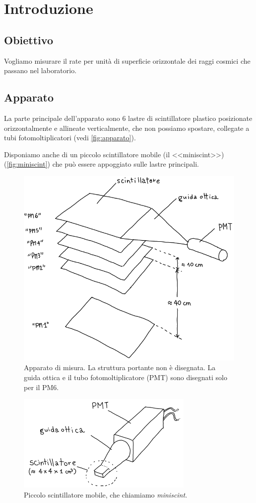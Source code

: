 \section{Introduzione}

\subsection{Obiettivo}

Vogliamo misurare il rate per unità di superficie orizzontale
dei raggi cosmici che passano nel laboratorio.

\subsection{Apparato}

La parte principale dell'apparato sono 6 lastre di scintillatore plastico
posizionate orizzontalmente e allineate verticalmente,
che non possiamo spostare,
collegate a tubi fotomoltiplicatori (vedi \autoref{fig:apparato}).

Disponiamo anche di un piccolo scintillatore mobile (il <<miniscint>>) (\autoref{fig:miniscint})
che può essere appoggiato sulle lastre principali.

\begin{figure}[H]
	\center
	\includegraphics[width=\textwidth]{apparato}
	\caption{\label{fig:apparato}
	Apparato di misura.
	La struttura portante non è disegnata.
	La guida ottica e il tubo fotomoltiplicatore (PMT) sono disegnati solo per il PM6.}
\end{figure}

\begin{figure}[H]
	\center
	\includegraphics[width=23em]{miniscint}
	\caption{\label{fig:miniscint}
	Piccolo scintillatore mobile, che chiamiamo \emph{miniscint}.}
\end{figure}

